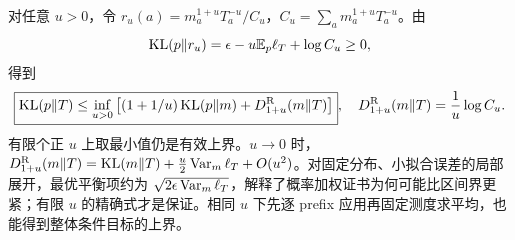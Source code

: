 对任意 $u>0$，令 $r_u(a)=m_a^{1+u}T_a^{-u}/C_u$，$C_u=\sum_am_a^{1+u}T_a^{-u}$。由
\begin{equation}
 \operatorname{KL}(p\Vert r_u)=\epsilon-u\mathbb E_p\ell_T+\log C_u\ge0,
\end{equation}
得到
\begin{equation}
 \boxed{\operatorname{KL}(p\Vert T)\le
 \inf_{u>0}\left[(1+1/u)\operatorname{KL}(p\Vert m)+D_{1+u}^{\mathrm R}(m\Vert T)\right]},\quad
 D_{1+u}^{\mathrm R}(m\Vert T)=\frac1u\log C_u.
 \label{eq:proximal-renyi-certificate}
\end{equation}
有限个正 $u$ 上取最小值仍是有效上界。$u\to0$ 时，$D_{1+u}^{\mathrm R}(m\Vert T)=\operatorname{KL}(m\Vert T)+\tfrac u2\operatorname{Var}_m\ell_T+O(u^2)$。对固定分布、小拟合误差的局部展开，最优平衡项约为 $\sqrt{2\epsilon\operatorname{Var}_m\ell_T}$，解释了概率加权证书为何可能比区间界更紧；有限 $u$ 的精确式才是保证。相同 $u$ 下先逐 prefix 应用再固定测度求平均，也能得到整体条件目标的上界。
